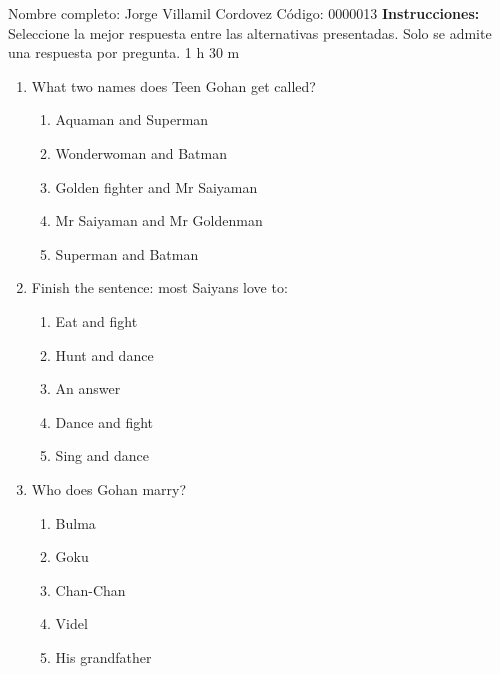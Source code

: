 \documentclass[letterpaper,addpoints,answers,twocolumn,10pt]{exam}
\begin{document}
\noindent Nombre completo: Jorge Villamil Cordovez
\newline \newline \newline \newline
Código: 0000013\newline \newline 
{\bf Instrucciones:} Seleccione la mejor respuesta entre las alternativas presentadas. Solo se admite una respuesta por pregunta.
 1 h 30 m

\begin{enumerate}[leftmargin=.2in]




\item  What two names does Teen Gohan get called?


\begin{enumerate}[noitemsep,leftmargin=0in]


\item  Aquaman and Superman
\item  Wonderwoman and Batman
\item  Golden fighter and Mr Saiyaman
\item  Mr Saiyaman and Mr Goldenman
\item  Superman and Batman


\end{enumerate}



\item  Finish the sentence: most Saiyans love to:


\begin{enumerate}[noitemsep,leftmargin=0in]


\item  Eat and fight
\item  Hunt and dance
\item  An answer
\item  Dance and fight
\item  Sing and dance


\end{enumerate}



\item  Who does Gohan marry?


\begin{enumerate}[noitemsep,leftmargin=0in]


\item  Bulma
\item  Goku
\item  Chan-Chan
\item  Videl
\item  His grandfather



\end{enumerate}
\end{enumerate}
\end{document}
